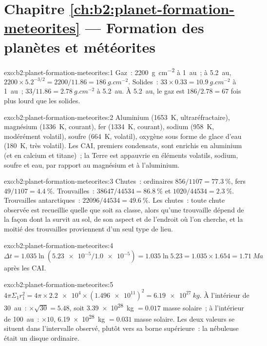 \section*{Chapitre \ref{ch:b2:planet-formation-meteorites} --- Formation des planètes et météorites}

\begin{solution}{exo:b2:planet-formation-meteorites:1}
Gaz~: \qty{2200}{g.cm^{-2}} à \qty{1}{au}~; à \qty{5.2}{au},
$2200\times5.2^{-3/2} = 2200/11.86 = \qty{186}{g.cm^{-2}}$. Solides~:
$33\times0.33 = \qty{10.9}{g.cm^{-2}}$ à \qty{1}{au}~;
$33/11.86 = \qty{2.78}{g.cm^{-2}}$ à \qty{5.2}{au}. À \qty{5.2}{au}, le gaz est
$186/2.78 = 67$ fois plus lourd que les solides.
\end{solution}

\begin{solution}{exo:b2:planet-formation-meteorites:2}
Aluminium (\qty{1653}{K}, ultraréfractaire), magnésium (\qty{1336}{K}, courant),
fer (\qty{1334}{K}, courant), sodium (\qty{958}{K}, modérément volatil), soufre
(\qty{664}{K}, volatil), oxygène sous forme de glace d'eau (\qty{180}{K}, très
volatil). Les CAI, premiers condensats, sont enrichis en aluminium (et en calcium
et titane)~; la Terre est appauvrie en éléments volatils, sodium, soufre et eau,
par rapport au magnésium et à l'aluminium.
\end{solution}

\begin{solution}{exo:b2:planet-formation-meteorites:3}
Chutes~:  ordinaires $856/1107 = \qty{77.3}{\percent}$, fers
$49/1107 = \qty{4.4}{\percent}$. Trouvailles~: $38647/44534 = \qty{86.8}{\percent}$ et
$1020/44534 = \qty{2.3}{\percent}$. Trouvailles antarctiques~: $22096/44534 =
\qty{49.6}{\percent}$. Les chutes~: toute chute observée est recueillie quelle que soit
sa classe, alors qu'une trouvaille dépend de la façon dont la  survit au sol,
de son aspect et de l'endroit où l'on cherche, et la moitié des trouvailles proviennent
d'un seul type de lieu.
\end{solution}

\begin{solution}{exo:b2:planet-formation-meteorites:4}
$\Delta t = 1.035\ln(\num{5.23e-5}/\num{1.0e-5}) = 1.035\ln 5.23 =
1.035\times1.654 = \qty{1.71}{Ma}$ après les CAI.
\end{solution}

\begin{solution}{exo:b2:planet-formation-meteorites:5}
$4\pi\Sigma_1 r_1^2 = 4\pi\times\num{2.2e4}\times(\num{1.496e11})^2 =
\qty{6.19e27}{kg}$. À l'intérieur de \qty{30}{au}~: $\times\sqrt{30} = 5.48$, soit
\qty{3.39e28}{kg} $= 0.017$ masse solaire~; à l'intérieur de \qty{100}{au}~: $\times10$,
\qty{6.19e28}{kg} $= 0.031$ masse solaire. Les deux valeurs se situent dans l'intervalle observé,
plutôt vers sa borne supérieure~: la nébuleuse était un disque ordinaire.
\end{solution}

